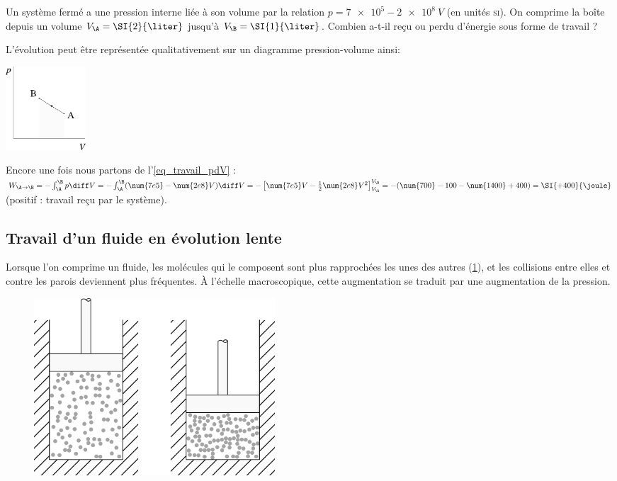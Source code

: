 		\begin{anexample}
			Un système fermé a une pression interne liée à son volume par la relation $p = \num{7e5} - \num{2e8} \ V$ (en unités \textsc{si}). On comprime la boîte depuis un volume $V_\A = \SI{2}{\liter}$ jusqu’à $V_\B = \SI{1}{\liter}$. Combien a-t-il reçu ou perdu d’énergie sous forme de travail ?
				\begin{answer}
						L’évolution peut être représentée qualitativement sur un diagramme pression-volume ainsi:
							\begin{center}
								\includegraphics[width=3cm]{images/ex_pv_prop.png}
							\end{center}
					Encore une fois nous partons de l’\cref{eq_travail_pdV} : $W_{\A\to\B} = - \int_\A^\B p \diff V = - \int_\A^\B (\num{7e5} - \num{2e8} V) \diff V = - \left[\num{7e5}V - \frac{1}{2}\num{2e8} V^2\right]_{V_\A}^{V_\B } = - (\num{700} - 100 - \num{1400} + 400) = \SI{+400}{\joule}$ (positif : travail reçu par le système).
				\end{answer}
		\end{anexample}
		

	\subsection{Travail d’un fluide en évolution lente}

		Lorsque l’on comprime un fluide, les molécules qui le composent sont plus rapprochées les unes des autres (\cref{fig_molécules_compression_lente}), et les collisions entre elles et contre les parois deviennent plus fréquentes. À l’échelle macroscopique, cette augmentation se traduit par une augmentation de la pression.
		
		\begin{figure}
			\begin{center}
			\includegraphics[width=9cm]{images/particules_compression_lente.png}
			\end{center}
			\label{fig_molécules_compression_lente}
		\end{figure}

